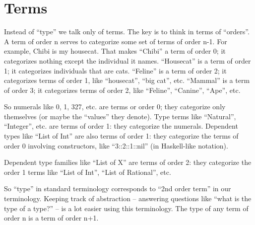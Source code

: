 \chapter{Terms}

Instead of ``type'' we talk only of terms.  The key is to think in terms
of ``orders''.  A term of order n serves to categorize some set of terms
of order n-1.  For example, Chibi is my housecat.  That makes ``Chibi''
a term of order 0; it categorizes nothing except the individual it
names.  ``Housecat'' is a term of order 1; it categorizes individuals
that are cats.  ``Feline'' is a term of order 2; it categorizes terms of
order 1, like ``housecat'', ``big cat'', etc.  ``Mammal'' is a term of order
3; it categorizes terms of order 2, like ``Feline'', ``Canine'', ``Ape'', etc.

So numerals like 0, 1, 327, etc. are terms or order 0; they categorize
only themselves (or maybe the ``values'' they denote).  Type terms like
``Natural'', ``Integer'', etc. are terms of order 1: they categorize the
numerals.  Dependent types like ``List of Int'' are also terms of order
1: they categorize the terms of order 0 involving constructors, like
``3::2::1::nil'' (in Haskell-like notation).

Dependent type families like ``List of X'' are terms of order 2: they
categorize the order 1 terms like ``List of Int'', ``List of
Rational'', etc.

So ``type'' in standard terminology corresponds to ``2nd order term''
in our terminology.  Keeping track of abstraction -- answering
questions like ``what is the type of a type?'' -- is a lot easier
using this terminology.  The type of any term of order n is a term of
order n+1.
